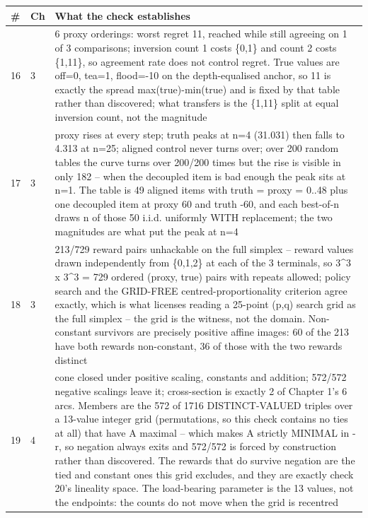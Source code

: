 \par\medskip
\noindent
\begin{tabularx}{\textwidth}{llX}
\toprule
\# & Ch & What the check establishes \\
\midrule
16 & 3 & 6 proxy orderings: worst regret 11, reached while still agreeing on 1 of 3 comparisons; inversion count 1 costs \{0,1\} and count 2 costs \{1,11\}, so agreement rate does not control regret. True values are off=0, tea=1, flood=-10 on the depth-equalised anchor, so 11 is exactly the spread max(true)-min(true) and is fixed by that table rather than discovered; what transfers is the \{1,11\} split at equal inversion count, not the magnitude \\
17 & 3 & proxy rises at every step; truth peaks at n=4 (31.031) then falls to 4.313 at n=25; aligned control never turns over; over 200 random tables the curve turns over 200/200 times but the rise is visible in only 182 -- when the decoupled item is bad enough the peak sits at n=1. The table is 49 aligned items with truth = proxy = 0..48 plus one decoupled item at proxy 60 and truth -60, and each best-of-n draws n of those 50 i.i.d. uniformly WITH replacement; the two magnitudes are what put the peak at n=4 \\
18 & 3 & 213/729 reward pairs unhackable on the full simplex -- reward values drawn independently from \{0,1,2\} at each of the 3 terminals, so 3\textasciicircum{}3 x 3\textasciicircum{}3 = 729 ordered (proxy, true) pairs with repeats allowed; policy search and the GRID-FREE centred-proportionality criterion agree exactly, which is what licenses reading a 25-point (p,q) search grid as the full simplex -- the grid is the witness, not the domain. Non-constant survivors are precisely positive affine images: 60 of the 213 have both rewards non-constant, 36 of those with the two rewards distinct \\
19 & 4 & cone closed under positive scaling, constants and addition; 572/572 negative scalings leave it; cross-section is exactly 2 of Chapter 1's 6 arcs. Members are the 572 of 1716 DISTINCT-VALUED triples over a 13-value integer grid (permutations, so this check contains no ties at all) that have A maximal -- which makes A strictly MINIMAL in -r, so negation always exits and 572/572 is forced by construction rather than discovered. The rewards that do survive negation are the tied and constant ones this grid excludes, and they are exactly check 20's lineality space. The load-bearing parameter is the 13 values, not the endpoints: the counts do not move when the grid is recentred \\
\bottomrule
\end{tabularx}
